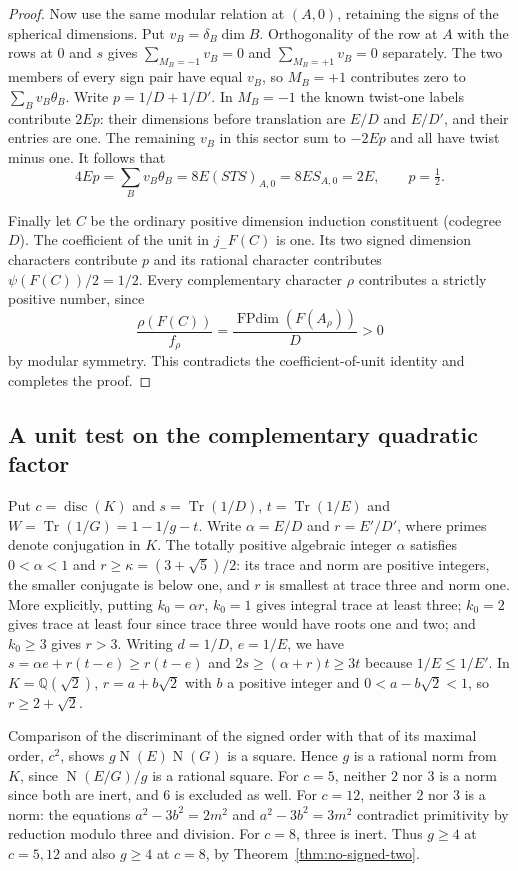 \documentclass[11pt,a4paper]{article}
\numberwithin{equation}{section}
\begin{document}
\begin{proof}
Now use the same modular relation at $(A,0)$, retaining the signs of the spherical dimensions. Put $v_B=\delta_B\dim B$. Orthogonality of the row at $A$ with the rows at $0$ and $s$ gives $\sum_{M_B=-1}v_B=0$ and $\sum_{M_B=+1}v_B=0$ separately. The two members of every sign pair have equal $v_B$, so $M_B=+1$ contributes zero to $\sum_B v_B\theta_B$. Write $p=1/D+1/D'$. In $M_B=-1$ the known twist-one labels contribute $2Ep$: their dimensions before translation are $E/D$ and $E/D'$, and their entries are one. The remaining $v_B$ in this sector sum to $-2Ep$ and all have twist minus one. It follows that
\[
 4Ep=\sum_B v_B\theta_B
    =8E(STS)_{A,0}=8E S_{A,0}=2E,
 \qquad p=\tfrac12 .
\]

Finally let $C$ be the ordinary positive dimension induction constituent (codegree $D$). The coefficient of the unit in $j_-F(C)$ is one. Its two signed dimension characters contribute $p$ and its rational character contributes $\psi(F(C))/2=1/2$. Every complementary character $\rho$ contributes a strictly positive number, since
\[
 \frac{\rho(F(C))}{f_\rho}
     =\frac{\operatorname{FPdim}(F(A_\rho))}{D}>0
\]
by modular symmetry. This contradicts the coefficient-of-unit identity and completes the proof.
\end{proof}



\subsection{A unit test on the complementary quadratic factor}\label{sec:quad-units}
Put  $c=\operatorname{disc}(K)$ and $s=\operatorname{Tr}(1/D)$, $t=\operatorname{Tr}(1/E)$ and $W=\operatorname{Tr}(1/G)=1-1/g-t$. Write $\alpha=E/D$ and $r=E'/D'$, where primes denote conjugation in $K$. The totally positive algebraic integer $\alpha$ satisfies $0<\alpha<1$ and $r\ge\kappa=(3+\sqrt5)/2$: its trace and norm are positive integers, the smaller conjugate is below one, and $r$ is smallest at trace three and norm one. More explicitly, putting $k_0=\alpha r$, $k_0=1$ gives integral trace at least three; $k_0=2$ gives trace at least four since trace three would have roots one and two; and $k_0\ge3$ gives $r>3$. Writing $d=1/D$, $e=1/E$, we have $s=\alpha e+r(t-e)\ge r(t-e)$ and $2s\ge(\alpha+r)t\ge3t$ because $1/E\le1/E'$. In $K=\mathbb Q(\sqrt2)$, $r=a+b\sqrt2$ with $b$ a positive integer and $0<a-b\sqrt2<1$, so $r\ge2+\sqrt2$.

Comparison of the discriminant of the signed order with that of its maximal order, $c^2$, shows
$g\operatorname{N}(E)\operatorname{N}(G)$ is a square. Hence $g$ is
a rational norm from $K$, since $\operatorname{N}(E/G)/g$ is a rational
square. For $c=5$, neither $2$ nor $3$ is a norm since both are inert,
and $6$ is excluded as well. For $c=12$, neither $2$ nor $3$ is
a norm: the equations $a^2-3b^2=2m^2$ and $a^2-3b^2=3m^2$ contradict
primitivity by reduction modulo three and division. For $c=8$, three
is inert. Thus $g\ge4$ at $c=5,12$ and also $g\ge4$ at
$c=8$, by Theorem~\ref{thm:no-signed-two}.
\end{document}
